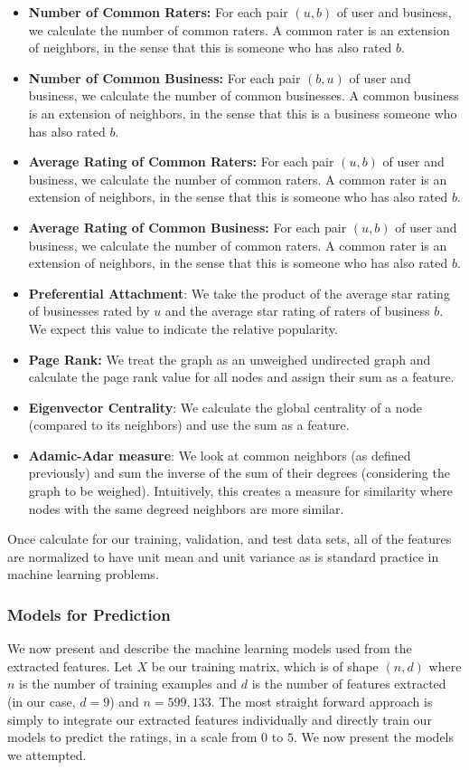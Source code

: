 \documentclass[letterpaper, 10 pt, conference]{ieeeconf}  %
\begin{document}
\begin{itemize}
\item \textbf{Number of Common Raters:} For each pair $(u,b)$ of user and business, we calculate the number of common raters. A common rater is an extension of neighbors, in the sense that this is someone who has also rated $b$.
\item \textbf{Number of Common Business:} For each pair $(b,u)$ of user and business, we calculate the number of common businesses. A common business is an extension of neighbors, in the sense that this is a business someone who has also rated $b$.
\item \textbf{Average Rating of Common Raters:} For each pair $(u,b)$ of user and business, we calculate the number of common raters. A common rater is an extension of neighbors, in the sense that this is someone who has also rated $b$.
\item \textbf{Average Rating of Common Business:} For each pair $(u,b)$ of user and business, we calculate the number of common raters. A common rater is an extension of neighbors, in the sense that this is someone who has also rated $b$.
\item \textbf{Preferential Attachment}: We take the product of the average star rating of businesses rated by $u$ and the average star rating of raters of business $b$. We expect this value to indicate the relative popularity.
\item \textbf{Page Rank:} We treat the graph as an unweighed undirected graph and calculate the page rank value for all nodes and assign their sum as a feature.
\item \textbf{Eigenvector Centrality}: We calculate the global centrality of a node (compared to its neighbors) and use the sum as a feature.
\item \textbf{Adamic-Adar measure}: We look at common neighbors (as defined previously) and sum the inverse of the sum of their degrees (considering the graph to be weighed). Intuitively, this creates a measure for similarity where nodes with the same degreed neighbors are more similar.
\end{itemize}


Once calculate for our training, validation, and test data sets, all of the features are normalized to have unit mean and unit variance as is standard practice in machine learning problems.

\subsubsection{Models for Prediction}
We now present and describe the machine learning models used from the extracted features. Let $X$ be our training matrix, which is of shape $(n,d)$ where $n$ is the number of training examples and $d$ is the number of features extracted (in our case, $d = 9$) and $n = 599,133$. The most straight forward approach is simply to integrate our extracted features individually and directly train our models to predict the ratings, in a scale from $0$ to $5$. We now present the models we attempted.
\end{document}
